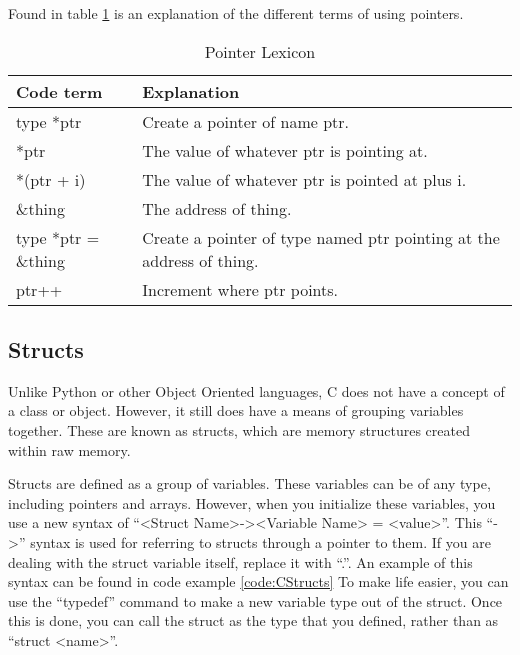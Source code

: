 			Found in table \ref{tab:PointerLexicon} is an explanation of the different terms of using pointers. 
			
			\begin{table}[htb]
				\centering
				\begin{adjustbox}{max width=1\textwidth}
				\begin{tabular}{| l | p{8cm} |}
					\hline
					\textbf{Code term} & \textbf{Explanation} \\ \hline
					type *ptr & Create a pointer of name ptr. \\ \hline
					*ptr & The value of whatever ptr is pointing at. \\ \hline
					*(ptr + i) & The value of whatever ptr is pointed at plus i. \\ \hline
					\&thing & The address of thing. \\ \hline
					type *ptr = \&thing & Create a pointer of type named ptr pointing at the address of thing. \\ \hline
					ptr++ & Increment where ptr points. \\ \hline
				\end{tabular}
				\end{adjustbox}
				\caption{Pointer Lexicon}
				\label{tab:PointerLexicon}
			\end{table}
		\subsection{Structs}
			Unlike Python or other Object Oriented languages, C does not have a concept of a class or object. 
			However, it still does have a means of grouping variables together. 
			These are known as structs, which are memory structures created within raw memory.

			Structs are defined as a group of variables. 
			These variables can be of any type, including pointers and arrays. 
			However, when you initialize these variables, you use a new syntax of ``<Struct Name>-><Variable Name> = <value>''. 
			This ``->'' syntax is used for referring to structs through a pointer to them. 
			If you are dealing with the struct variable itself, replace it with ``.''. 
			An example of this syntax can be found in code example \ref{code:CStructs}	
			To make life easier, you can use the ``typedef'' command to make a new variable type out of the struct. 
			Once this is done, you can call the struct as the type that you defined, rather than as ``struct <name>''. 

